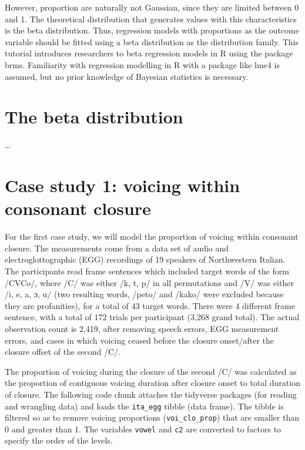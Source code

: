 \documentclass[
  authoryear,
  preprint,
  3p]{elsarticle}
\begin{document}
However, proportion are naturally not Gaussian, since they are limited
between 0 and 1. The theoretical distribution that generates values with
this characteristics is the beta distribution. Thus, regression models
with proportions as the outcome variable should be fitted using a beta
distribution as the distribution family. This tutorial introduces
researchers to beta regression models in R using the package brms.
Familiarity with regression modelling in R with a package like lme4 is
assumed, but no prior knowledge of Bayesian statistics is necessary.

\section{The beta distribution}\label{the-beta-distribution}

\ldots{}

\section{Case study 1: voicing within consonant
closure}\label{case-study-1-voicing-within-consonant-closure}

For the first case study, we will model the proportion of voicing within
consonant closure. The measurements come from a data set of audio and
electroglottographic (EGG) recordings of 19 speakers of Northwestern
Italian. The participants read frame sentences which included target
words of the form /CVCo/, where /C/ was either /k, t, p/ in all
permutations and /V/ was either /i, e, a, ɔ, u/ (two resulting words,
/peto/ and /kako/ were excluded because they are profanities), for a
total of 43 target words. There were 4 different frame sentence, with a
total of 172 trials per participant (3,268 grand total). The actual
observation count is 2,419, after removing speech errors, EGG
measurement errors, and cases in which voicing ceased before the closure
onset/after the closure offset of the second /C/.

The proportion of voicing during the closure of the second /C/ was
calculated as the proportion of contiguous voicing duration after
closure onset to total duration of closure. The following code chunk
attaches the tidyverse packages (for reading and wrangling data) and
loads the \texttt{ita\_egg} tibble (data frame). The tibble is filtered
so as to remove voicing proportions (\texttt{voi\_clo\_prop}) that are
smaller than 0 and greater than 1. The variables \texttt{vowel} and
\texttt{c2} are converted to factors to specify the order of the levels.
\end{document}

